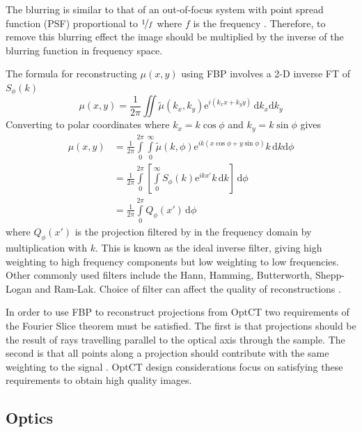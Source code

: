 \documentclass[12pt]{article}
\begin{document}
The blurring is similar to that of an out-of-focus system with point spread function (PSF) proportional to $\nicefrac{1}{f}$ where $f$ is the frequency \cite{russ2002image}. Therefore, to remove this blurring effect the image should be multiplied by the inverse of the blurring function in frequency space.

The formula for reconstructing $\mu(x,y)$ using FBP involves a 2-D inverse FT of $S_{\phi}(k)$
\begin{equation}
\mu(x,y) = \frac{1}{2\pi} \iint \tilde{\mu}(k_x,k_y) \mathrm{e}^{i\left(k_xx+k_yy\right)}\, \mathrm{d}k_x\mathrm{d}k_y
\end{equation}
Converting to polar coordinates where $k_x=k\cos\phi$ and $k_y=k\sin\phi$ gives
\begin{align}
\mu(x,y) &= \frac{1}{2\pi} \int\limits_0^{2\pi} \int\limits_0^{\infty} \tilde{\mu}(k,\phi) \mathrm{e}^{ik\left(x\cos\phi+y\sin\phi\right)}k\, \mathrm{d}k\mathrm{d}\phi \\
&= \frac{1}{2\pi} \int\limits_0^{2\pi}\left[\int\limits_0^{\infty}S_{\phi}(k)\mathrm{e}^{ikx'}k\, \mathrm{d}k \right]\, \mathrm{d}\phi \\
&= \frac{1}{2\pi} \int\limits_0^{2\pi}Q_{\phi}(x')\, \mathrm{d}\phi
\end{align}
where $Q_{\phi}(x')$ is the projection filtered by in the frequency domain by multiplication with $k$. This is known as the ideal inverse filter, giving high weighting to high frequency components but low weighting to low frequencies. Other commonly used filters include the Hann,  Hamming, Butterworth, Shepp-Logan and Ram-Lak. Choice of filter can affect the quality of reconstructions \cite{russ2002image}.

In order to use  FBP to reconstruct projections from OptCT two requirements of the Fourier Slice theorem must be satisfied. The first is that projections should be the result of rays travelling parallel to the optical axis through the sample. The second is that all points along a projection should contribute with the same weighting to the signal \cite{Wang:2007}. OptCT design considerations focus on satisfying these requirements to obtain high quality images.






\subsection{Optics}
\end{document}
